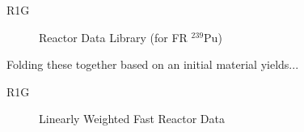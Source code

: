 \documentclass[pdf, autumn, slideColor, nocolorBG]{prosper}
\newcommand{\superscript}[1]{\ensuremath{^{\textrm{#1}}}}
\newcommand{\nuc}[2]{\superscript{#2}{#1}}
\begin{document}
{\begin{slide}{R1G}
\begin{center}
\begin{figure}
\caption{Reactor Data Library (for FR \nuc{Pu}{239})}
\end{figure}

\end{center}

\footnotesize
Folding these together based on an initial material yields...
\end{slide}}





\begin{slide}{R1G}
\begin{center}
\begin{figure}
\caption{Linearly Weighted Fast Reactor Data}
\end{figure}
\end{center}
\end{slide}
\end{document}
